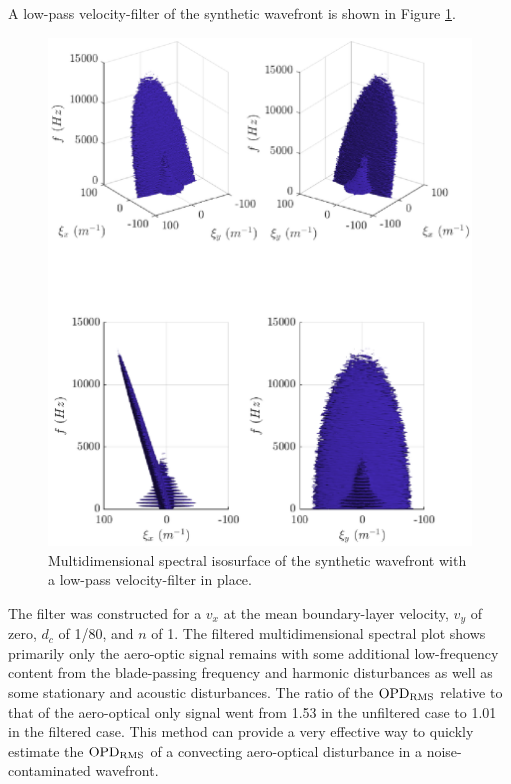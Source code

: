 A low-pass velocity-filter of the synthetic wavefront is shown in Figure \ref{fig:06_filter_velocity}.
\begin{figure}
 \centering
 \includegraphics{../matlab/06_single_sensor_filtering/filter_velocity.eps}
 \caption{Multidimensional spectral isosurface of the synthetic wavefront with a low-pass velocity-filter in place.}
 \label{fig:06_filter_velocity}
\end{figure}
The filter was constructed for a $v_x$ at the mean boundary-layer velocity, $v_y$ of zero, $d_c$ of 1/80, and $n$ of 1.
The filtered multidimensional spectral plot shows primarily only the aero-optic signal remains with some additional low-frequency content from the blade-passing frequency and harmonic disturbances as well as some stationary and acoustic disturbances.
The ratio of the $\operatorname{OPD_{RMS}}$ relative to that of the aero-optical only signal went from 1.53 in the unfiltered case to 1.01 in the filtered case.
This method can provide a very effective way to quickly estimate the $\operatorname{OPD_{RMS}}$ of a convecting aero-optical disturbance in a noise-contaminated wavefront.

